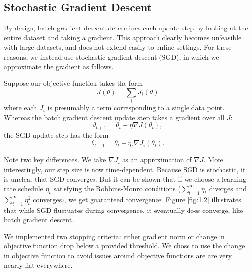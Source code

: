 \documentclass{article}
\begin{document}
\begin{multicols}{2}


\subsection{Stochastic Gradient Descent}

By design, batch gradient descent determines each update step by looking at the entire dataset and taking a gradient. This approach clearly becomes unfeasible with large datasets, and does not extend easily to online settings. For these reasons, we instead use stochastic gradient descent (SGD), in which we approximate the gradient as follows.

Suppose our objective function takes the form
\begin{equation}
J(\theta) = \sum_i J_i(\theta)
\end{equation}
where each $J_i$ is presumably a term corresponding to a single data point. Whereas the batch gradient descent update step takes a gradient over all $J$:
\begin{equation}
\theta_{t+1} = \theta_t - \eta \nabla J(\theta_t),
\end{equation}
the SGD update step has the form
\begin{equation} \theta_{t+1} = \theta_t - \eta_t \nabla J_i(\theta_t). \end{equation}

Note two key differences. We take $\nabla J_i$ as an approximation of $\nabla J$. More interestingly, our step size is now time-dependent. Because SGD is stochastic, it is unclear that SGD converges. But it can be shown that if we choose a learning rate schedule $\eta_t$ satisfying the Robbins-Monro conditions ($\sum_{t=1}^\infty \eta_t$ diverges and $\sum_{t=1}^\infty \eta_t^2$ converges), we get guaranteed convergence. Figure \ref{fig:1.2} illustrates that while SGD fluctuates during convergence, it eventually does converge, like batch gradient descent.

We implemented two stopping criteria: either gradient norm or change in objective function drop below a provided threshold. We chose to use the change in objective function to avoid issues around objective functions are are very nearly flat everywhere.




\end{multicols}
\end{document}
